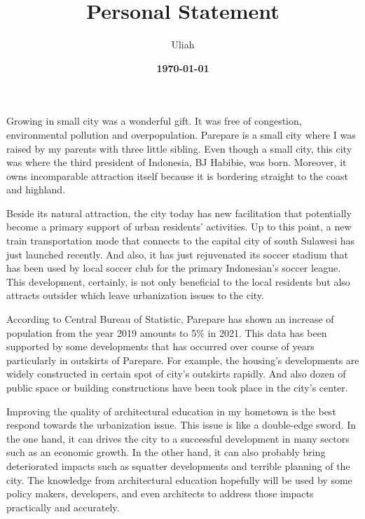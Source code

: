 \documentclass[11pt]{simart} %
\title{
\textbf{Personal Statement} \\
} %
\date{\textbf{\today}}
\author{Uliah}
\begin{document}


Growing in small city was a wonderful gift. It was free of congestion, environmental pollution and overpopulation. Parepare is a small city where I was raised by my parents with three little sibling. Even though a small city, this city was where the third president of Indonesia, BJ Habibie, was born.
Moreover, it owns incomparable attraction itself because it is bordering straight to the coast and highland.

Beside its natural attraction, the city today has new facilitation that potentially become a primary support of urban residents' activities.
Up to this point, a new train transportation mode that connects to the capital city of south Sulawesi has just launched recently.
And also, it has just rejuvenated its soccer stadium that has been used by local soccer club for the primary Indonesian's soccer league.
This development, certainly, is not only beneficial to the local residents but also attracts outsider which leave urbanization issues to the city.

According to Central Bureau of Statistic, Parepare has shown an increase of population from the year 2019 amounts to 5\% in 2021. This data has been supported by some developments that has occurred over course of years particularly in outskirts of Parepare. For example, the housing's developments are widely constructed in certain spot of city's outskirts rapidly. And also dozen of public space or building constructions have been took place in the city's center.

Improving the quality of architectural education in my hometown is the best respond towards the urbanization issue.
This issue is like a double-edge sword. In the one hand, it can drives the city to a successful development in many sectors such as an economic growth. In the other hand, it can also probably bring deteriorated impacts such as squatter developments and terrible planning of the city. The knowledge from architectural education hopefully will be used by some policy makers, developers, and even architects to address those impacts practically and accurately.
\end{document}
